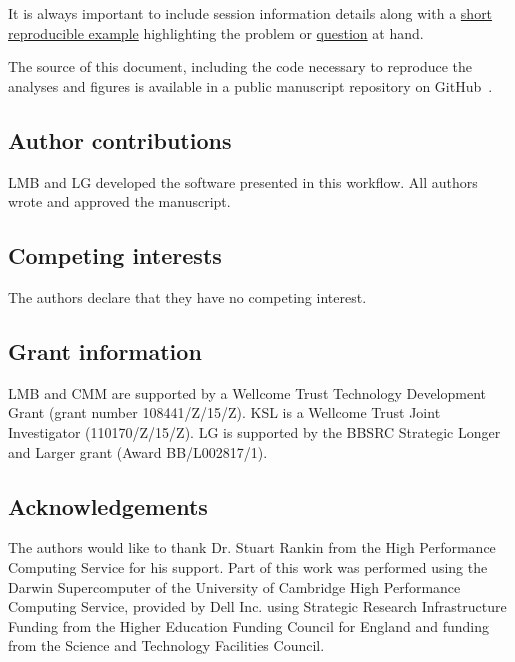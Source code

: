 \begin{knitrout}
\color{fgcolor}\begin{kframe}
\begin{alltt}
\hlstd{(}\hlstd{)}
\hlstd{()}
\end{alltt}
\end{kframe}
\end{knitrout}

It is always important to include session information details along
with a \href{http://adv-r.had.co.nz/Reproducibility.html}{short
  reproducible example} highlighting the problem or
\href{https://support.bioconductor.org/}{question} at hand.

\bigskip

The source of this document, including the code necessary to reproduce
the analyses and figures is available in a public manuscript
repository on GitHub~\cite{ghrepo}.

\bigskip

\subsection*{Author contributions}

LMB and LG developed the software presented in this workflow. All
authors wrote and approved the manuscript.

\subsection*{Competing interests}

The authors declare that they have no competing interest.

\subsection*{Grant information}

LMB and CMM are supported by a Wellcome Trust Technology Development
Grant (grant number 108441/Z/15/Z). KSL is a Wellcome Trust Joint
Investigator (110170/Z/15/Z). LG is supported by the BBSRC Strategic
Longer and Larger grant (Award BB/L002817/1).


\subsection*{Acknowledgements}

The authors would like to thank Dr. Stuart Rankin from the High
Performance Computing Service for his support. Part of this work was
performed using the Darwin Supercomputer of the University of
Cambridge High Performance Computing Service, provided by Dell
Inc. using Strategic Research Infrastructure Funding from the Higher
Education Funding Council for England and funding from the Science and
Technology Facilities Council.

